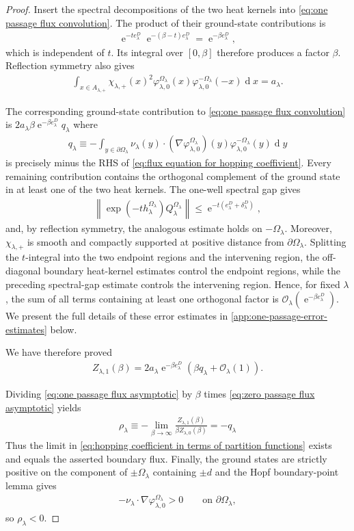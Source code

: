 \documentclass[a4paper,10pt]{article}
\numberwithin{equation}{section}
\theoremstyle{plain}
\theoremstyle{plain}
\theoremstyle{plain}
\theoremstyle{plain}
\theoremstyle{plain}
\theoremstyle{remark}
\theoremstyle{definition}
\newcommand{\ee}{\operatorname{e}}
\newcommand{\calO}{\mathcal{O}}
\newcommand\norm[1]{\left\lVert#1\right\rVert}
\newcommand{\dif}{\operatorname{d}\!} %
\newcommand{\vf}{\varphi}
\newcommand{\eq}[1]{\begin{align*}#1\end{align*}}
\newcommand{\eql}[1]{\begin{align}#1\end{align}}
\newcommand{\br}[1]{\left(#1\right)}
\begin{document}
\begin{proof}
Insert the spectral decompositions of the two heat kernels into
\cref{eq:one passage flux convolution}. The product of their
ground-state contributions is
\eq{
\ee^{-t e_\lambda^D}
\ee^{-(\beta-t)e_\lambda^D}
=
\ee^{-\beta e_\lambda^D},
}
which is independent of $t$. Its integral over $[0,\beta]$ therefore
produces a factor $\beta$. Reflection symmetry also gives
\eq{
\int_{x\in A_{\lambda,+}}
\chi_{\lambda,+}(x)^2
\vf_{\lambda,0}^{\Omega_\lambda}(x)
\vf_{\lambda,0}^{-\Omega_\lambda}(-x)
\dif{x}
=
a_\lambda.
}

The corresponding ground-state contribution to
\cref{eq:one passage flux convolution} is $2a_\lambda\beta\ee^{-\beta e_\lambda^D} q_\lambda
$ where \eq{q_\lambda\equiv
-\int_{y\in\partial\Omega_\lambda}
\nu_\lambda(y)\cdot
\br{\nabla\vf_{\lambda,0}^{\Omega_\lambda}}(y)
\vf_{\lambda,0}^{-\Omega_\lambda}(y)
\dif{y}} is precisely minus the RHS of \cref{eq:flux equation for hopping coeffivient}.
Every remaining contribution contains the orthogonal complement of the
ground state in at least one of the two heat kernels. The one-well
spectral gap gives
\eq{
\norm{
\exp\br{-t h_\lambda^{\Omega_\lambda}}
Q_\lambda^{\Omega_\lambda}
}
\leq
\ee^{-t\br{e_\lambda^D+\delta_\lambda^D}},
}
and, by reflection symmetry, the analogous estimate holds on
$-\Omega_\lambda$. Moreover, $\chi_{\lambda,+}$ is smooth and compactly
supported at positive distance from $\partial\Omega_\lambda$. Splitting
the $t$-integral into the two endpoint regions and the intervening
region, the off-diagonal boundary heat-kernel estimates control the
endpoint regions, while the preceding spectral-gap estimate controls
the intervening region. Hence, for fixed $\lambda$, the sum of all
terms containing at least one orthogonal factor is
$\calO_\lambda\br{\ee^{-\beta e_\lambda^D}}$. We present the full details of these error estimates in \cref{app:one-passage-error-estimates} below.

We have therefore proved
\eql{\label{eq:one passage flux asymptotic}
Z_{\lambda,1}(\beta)
=
2a_\lambda\ee^{-\beta e_\lambda^D}
\br{
\beta q_\lambda
+\calO_\lambda(1)
}.
}

Dividing \cref{eq:one passage flux asymptotic} by
$\beta$ times \cref{eq:zero passage flux asymptotic} yields
\eq{
\rho_\lambda\equiv -\lim_{\beta\to\infty}
\frac{Z_{\lambda,1}(\beta)}
{\beta Z_{\lambda,0}(\beta)}
= -q_\lambda
}
Thus the limit in
\cref{eq:hopping coefficient in terms of partition functions} exists
and equals the asserted boundary flux.
Finally, the ground states are strictly positive on the component of $\pm\Omega_\lambda$ containing $\pm d$ and the Hopf
boundary-point lemma gives
\eq{
-\nu_\lambda\cdot
\nabla\vf_{\lambda,0}^{\Omega_\lambda}
>
0
\qquad\text{on }\partial\Omega_\lambda,
}
so $\rho_\lambda<0$.
\end{proof}
\end{document}

